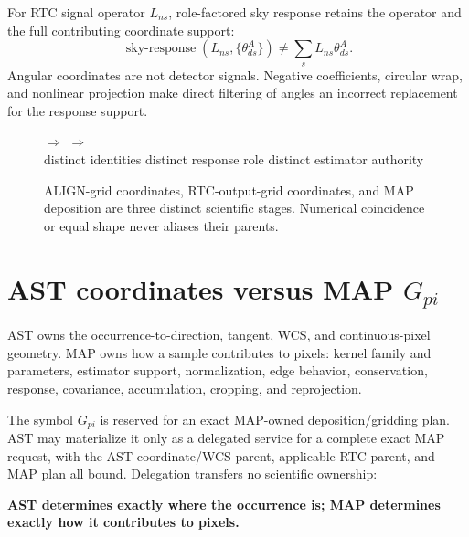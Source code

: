 \documentclass[10pt]{article}
\begin{document}
For RTC signal operator $L_{ns}$, role-factored sky response retains the
operator and the full contributing coordinate support:
\begin{equation*}
 \operatorname{sky\mbox{-}response}
 (L_{ns},\{\theta^A_{ds}\})\ne
 \sum_s L_{ns}\theta^A_{ds}.
\end{equation*}
Angular coordinates are not detector signals. Negative coefficients,
circular wrap, and nonlinear projection make direct filtering of angles an
incorrect replacement for the response support.

\begin{figure}[!ht]
\centering
{}\quad$\Longrightarrow$\quad
{}
\quad$\Longrightarrow$\quad
{}\\[10pt]
\small distinct identities \hfill distinct response role \hfill distinct estimator authority
\caption{ALIGN-grid coordinates, RTC-output-grid coordinates, and MAP
deposition are three distinct scientific stages. Numerical coincidence or
equal shape never aliases their parents.}
\label{fig:grid-roles}
\end{figure}

\newpage
\section{AST coordinates versus MAP $G_{pi}$}
AST owns the occurrence-to-direction, tangent, WCS, and continuous-pixel
geometry. MAP owns how a sample contributes to pixels: kernel family and
parameters, estimator support, normalization, edge behavior, conservation,
response, covariance, accumulation, cropping, and reprojection.

The symbol $G_{pi}$ is reserved for an exact MAP-owned deposition/gridding
plan. AST may materialize it only as a delegated service for a complete exact
MAP request, with the AST coordinate/WCS parent, applicable RTC parent, and
MAP plan all bound. Delegation transfers no scientific ownership:
\begin{center}
\textbf{AST determines exactly where the occurrence is; MAP determines
exactly how it contributes to pixels.}
\end{center}
\end{document}
